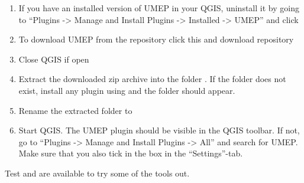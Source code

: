 \documentclass[letterpaper,10pt,english]{sphinxmanual}
\begin{document}
\begin{enumerate}
\item {} 
If you have an installed version of UMEP in your QGIS, uninstall it by going to “Plugins -\textgreater{} Manage and Install Plugins -\textgreater{} Installed -\textgreater{} UMEP” and click 

\item {} 
To download UMEP from the repository click this  and download repository

\item {} 
Close QGIS if open

\item {} 
Extract the downloaded zip archive into the folder . If the folder  does not exist, install any plugin using  and the folder should appear.

\item {} 
Rename the extracted folder to 

\item {} 
Start QGIS. The UMEP plugin should be visible in the QGIS toolbar. If not, go to “Plugins -\textgreater{} Manage and Install Plugins -\textgreater{} All” and search for UMEP. Make sure that you also tick in the box  in the “Settings”-tab.

\end{enumerate}

Test  and {\hyperref[\detokenize{Tutorials/Tutorials:tutorials}]{}} are available to try some of the tools out.
\end{document}
